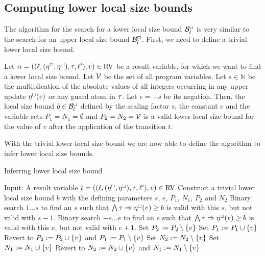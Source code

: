\subsection{Computing lower local size bounds}

The algorithm for the search for a lower local size bound $\mathcal{B}^\sqcup_l$ is very similar to the search for an upper local size bound $\mathcal{B}^\sqcap_l$.
First, we need to define a trivial lower local size bound.

\begin{definition}
  Let $\alpha = ((\ell,(\eta^\sqcap,\eta^\sqcup),\tau,\ell'),v) \in \text{RV}$ be a result variable, for which we want to find a lower local size bound.
  Let $\mathcal{V}$ be the set of all program variables.
  Let $s \in \mathbb{N}$ be the multiplication of the absolute values of all integers occurring in any upper update $\eta^\sqcup(v)$ or any guard atom in $\tau$.
  Let $e = -s$ be its negation.
  Then, the local size bound $b \in \mathcal{B}^\sqcup_l$ defined by the scaling factor $s$, the constant $e$ and the variable sets $P_1 = N_1 = \emptyset$ and $P_2 = N_2 = \mathcal{V}$ is a valid lower local size bound for the value of $v$ after the application of the transition $t$.
\end{definition}

With the trivial lower local size bound we are now able to define the algorithm to infer lower local size bounds.

\begin{algorithm}
\caption{Inferring lower local size bound}\label{llsb_algorithm}
\begin{algorithmic}[1]
  \State Input: A result variable $t = ((\ell,(\eta^\sqcap,\eta^\sqcup),\tau,\ell'),v) \in \text{RV}$
  \State Construct a trivial lower local size bound $b$ with the defining parameters $s$, $e$, $P_1$, $N_1$, $P_2$ and $N_2$
  \State Binary search $1 \dots s$ to find an $s$ such that $\bigwedge \tau \Rightarrow \eta^\sqcup(v) \geq b$ is valid with this $s$, but not valid with $s-1$.
  \State Binary search $-e \dots e$ to find an $e$ such that $\bigwedge \tau \Rightarrow \eta^\sqcup(v) \geq b$ is valid with this $e$, but not valid with $e+1$.
    \State Set $P_2 := P_2 \setminus \lbrace v \rbrace$
      \State Set $P_1 := P_1 \cup \lbrace v \rbrace$
        \State Revert to $P_2 := P_2 \cup \lbrace v \rbrace$ and $P_1 := P_1 \setminus \lbrace v \rbrace$
      \EndIf
    \EndIf
    \State Set $N_2 := N_2 \setminus \lbrace v \rbrace$
      \State Set $N_1 := N_1 \cup \lbrace v \rbrace$
        \State Revert to $N_2 := N_2 \cup \lbrace v \rbrace$ and $N_1 := N_1 \setminus \lbrace v \rbrace$
      \EndIf
    \EndIf
  \EndFor
\end{algorithmic}
\end{algorithm}


